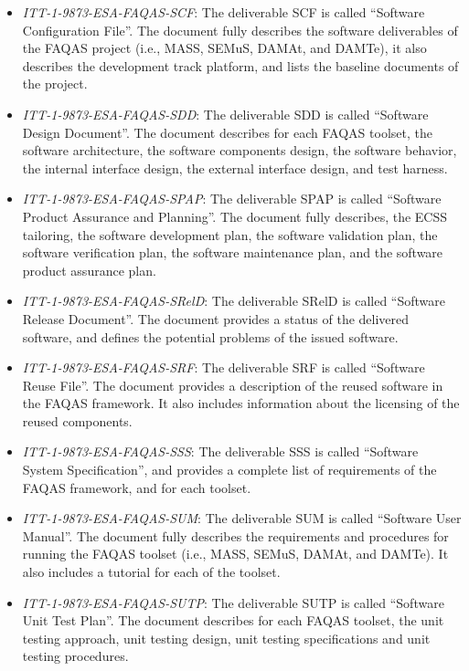 \begin{itemize}
	\item \emph{ITT-1-9873-ESA-FAQAS-SCF}: The deliverable SCF is called ``Software Configuration File''. The document fully describes the software deliverables of the FAQAS project (i.e., MASS, SEMuS, DAMAt, and DAMTe), it also describes the development track platform, and lists the baseline documents of the project.

	\item \emph{ITT-1-9873-ESA-FAQAS-SDD}: The deliverable SDD is called ``Software Design Document''. The document describes for each FAQAS toolset, the software architecture, the software components design, the software behavior, the internal interface design, the external interface design, and test harness.

	\item \emph{ITT-1-9873-ESA-FAQAS-SPAP}: The deliverable SPAP is called ``Software Product Assurance and Planning''. The document fully describes, the ECSS tailoring, the software development plan, the software validation plan, the software verification plan, the software maintenance plan, and the software product assurance plan.

	\item \emph{ITT-1-9873-ESA-FAQAS-SRelD}: The deliverable SRelD is called ``Software Release Document''. The document provides a status of the delivered software, and defines the potential problems of the issued software.

	\item \emph{ITT-1-9873-ESA-FAQAS-SRF}: The deliverable SRF is called ``Software Reuse File''. The document provides a description of the reused software in the FAQAS framework. It also includes information about the licensing of the reused components.

	\item \emph{ITT-1-9873-ESA-FAQAS-SSS}: The deliverable SSS is called ``Software System Specification'', and provides a complete list of requirements of the FAQAS framework, and for each toolset.

	\item \emph{ITT-1-9873-ESA-FAQAS-SUM}: The deliverable SUM is called ``Software User Manual''. The document fully describes the requirements and procedures for running the FAQAS toolset (i.e., MASS, SEMuS, DAMAt, and DAMTe). It also includes a tutorial for each of the toolset.

	\item \emph{ITT-1-9873-ESA-FAQAS-SUTP}: The deliverable SUTP is called ``Software Unit Test Plan''. The document describes for each FAQAS toolset, the unit testing approach, unit testing design, unit testing specifications and unit testing procedures.


\end{itemize}
